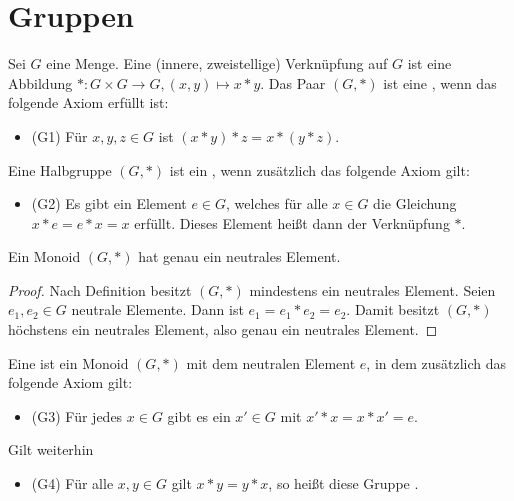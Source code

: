 \section{Gruppen}

\begin{definition}
	Sei $G$ eine Menge. Eine (innere, zweistellige) Verknüpfung
	auf $G$ ist eine Abbildung $*: G \times G \to G, (x,y) \mapsto x*y$. Das Paar $(G,*)$ ist eine
	, wenn das folgende Axiom erfüllt ist:
	\begin{itemize}
		\item (G1) Für $x,y,z \in G$ ist $(x*y)*z=x*(y*z)$.
	\end{itemize}
		Eine Halbgruppe $(G,*)$ ist ein , wenn zusätzlich das folgende Axiom gilt:
	\begin{itemize}
		\item (G2) Es gibt ein Element $e \in G$, welches für alle $x \in G$ die Gleichung $x*e=e*x=x$
		erfüllt. Dieses Element heißt dann  der Verknüpfung $*$.  
	\end{itemize}
\end{definition}

\begin{proposition}
	Ein Monoid $(G,*)$ hat genau ein neutrales Element. 
\end{proposition}
\begin{proof}
	Nach Definition besitzt $(G,*)$ mindestens ein neutrales Element. Seien $e_1,e_2\in G$ neutrale Elemente. Dann 
	ist $e_1=e_1 * e_2=e_2$. Damit besitzt $(G,*)$ höchstens ein neutrales Element, also genau ein neutrales Element.
\end{proof}

\begin{definition}
	Eine  ist ein Monoid $(G,*)$ mit dem neutralen Element
	$e$, in dem zusätzlich das folgende Axiom gilt:
	\begin{itemize}
		\item (G3) Für jedes $x \in G$ gibt es ein $x' \in G$ mit $x'*x=x*x'=e$.
	\end{itemize}
	Gilt weiterhin
	\begin{itemize}
		\item (G4) Für alle $x,y \in G$ gilt $x*y=y*x$, so heißt diese Gruppe .
	\end{itemize}
\end{definition}


